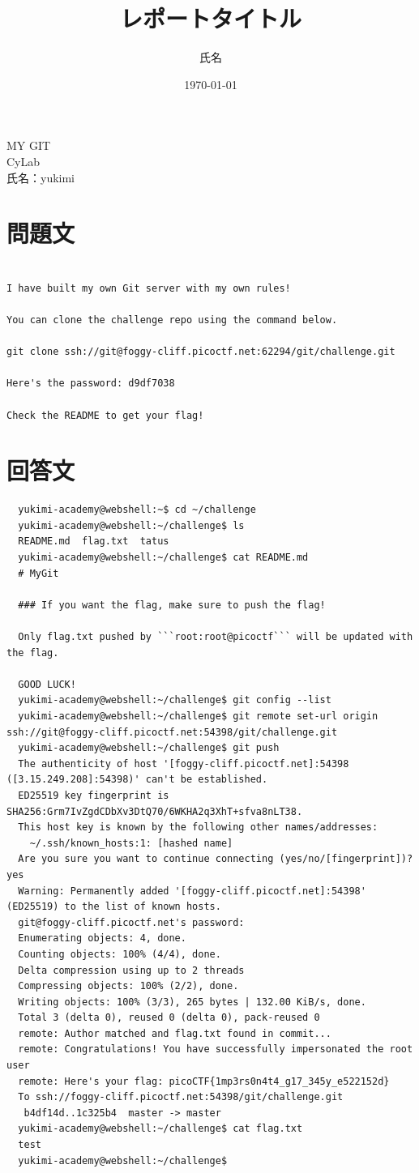\documentclass[a4paper,11pt,lualatex,ja=standard]{bxjsarticle}
\newcommand{\cover}[3]{
  \thispagestyle{empty}
  \vspace*{4cm}
  \begin{center}
    {\LARGE #1}\\[2cm]
    {\Large #2}\\[3cm]
    {\large 氏名：#3}\\[1cm]
  \end{center}
  \newpage
}
\begin{document}
\cover{MY GIT}{CyLab}{yukimi}

\title{レポートタイトル}
\author{氏名}
\date{\today}

\section{問題文}
\begin{verbatim}

I have built my own Git server with my own rules!

You can clone the challenge repo using the command below.

git clone ssh://git@foggy-cliff.picoctf.net:62294/git/challenge.git

Here's the password: d9df7038

Check the README to get your flag!
\end{verbatim}

\section{回答文}
\begin{verbatim}
  yukimi-academy@webshell:~$ cd ~/challenge
  yukimi-academy@webshell:~/challenge$ ls
  README.md  flag.txt  tatus
  yukimi-academy@webshell:~/challenge$ cat README.md 
  # MyGit

  ### If you want the flag, make sure to push the flag!

  Only flag.txt pushed by ```root:root@picoctf``` will be updated with the flag.

  GOOD LUCK!
  yukimi-academy@webshell:~/challenge$ git config --list
  yukimi-academy@webshell:~/challenge$ git remote set-url origin ssh://git@foggy-cliff.picoctf.net:54398/git/challenge.git
  yukimi-academy@webshell:~/challenge$ git push
  The authenticity of host '[foggy-cliff.picoctf.net]:54398 ([3.15.249.208]:54398)' can't be established.
  ED25519 key fingerprint is SHA256:Grm7IvZgdCDbXv3DtQ70/6WKHA2q3XhT+sfva8nLT38.
  This host key is known by the following other names/addresses:
    ~/.ssh/known_hosts:1: [hashed name]
  Are you sure you want to continue connecting (yes/no/[fingerprint])? yes
  Warning: Permanently added '[foggy-cliff.picoctf.net]:54398' (ED25519) to the list of known hosts.
  git@foggy-cliff.picoctf.net's password: 
  Enumerating objects: 4, done.
  Counting objects: 100% (4/4), done.
  Delta compression using up to 2 threads
  Compressing objects: 100% (2/2), done.
  Writing objects: 100% (3/3), 265 bytes | 132.00 KiB/s, done.
  Total 3 (delta 0), reused 0 (delta 0), pack-reused 0
  remote: Author matched and flag.txt found in commit...
  remote: Congratulations! You have successfully impersonated the root user
  remote: Here's your flag: picoCTF{1mp3rs0n4t4_g17_345y_e522152d}
  To ssh://foggy-cliff.picoctf.net:54398/git/challenge.git
   b4df14d..1c325b4  master -> master
  yukimi-academy@webshell:~/challenge$ cat flag.txt 
  test
  yukimi-academy@webshell:~/challenge$ 

\end{verbatim}
\end{document}
